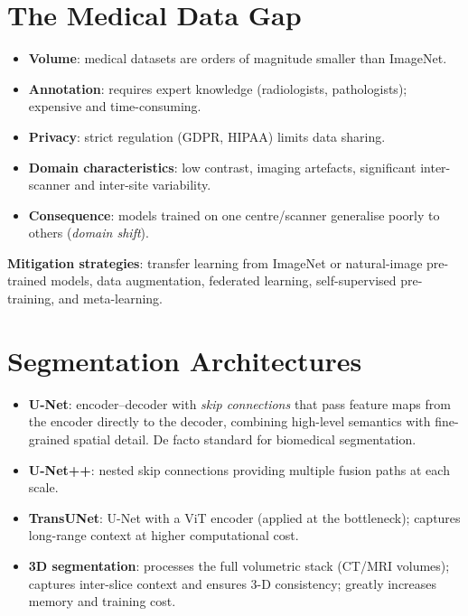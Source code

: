 \documentclass[12pt,a4paper]{report}
\begin{document}
\section{The Medical Data Gap}

\begin{itemize}[itemsep=1pt]
    \item \textbf{Volume}: medical datasets are orders of magnitude smaller
          than ImageNet.
    \item \textbf{Annotation}: requires expert knowledge (radiologists,
          pathologists); expensive and time-consuming.
    \item \textbf{Privacy}: strict regulation (GDPR, HIPAA) limits data
          sharing.
    \item \textbf{Domain characteristics}: low contrast, imaging artefacts,
          significant inter-scanner and inter-site variability.
    \item \textbf{Consequence}: models trained on one centre/scanner generalise
          poorly to others (\emph{domain shift}).
\end{itemize}

\textbf{Mitigation strategies}: transfer learning from ImageNet or
natural-image pre-trained models, data augmentation, federated learning,
self-supervised pre-training, and meta-learning.

\section{Segmentation Architectures}

\begin{itemize}[itemsep=2pt]
    \item \textbf{U-Net}: encoder--decoder with \emph{skip connections} that
          pass feature maps from the encoder directly to the decoder, combining
          high-level semantics with fine-grained spatial detail.
          De facto standard for biomedical segmentation.
    \item \textbf{U-Net++}: nested skip connections providing multiple fusion
          paths at each scale.
    \item \textbf{TransUNet}: U-Net with a ViT encoder (applied at the
          bottleneck); captures long-range context at higher computational cost.
    \item \textbf{3D segmentation}: processes the full volumetric stack
          (CT/MRI volumes); captures inter-slice context and ensures
          3-D consistency; greatly increases memory and training cost.
\end{itemize}
\end{document}
